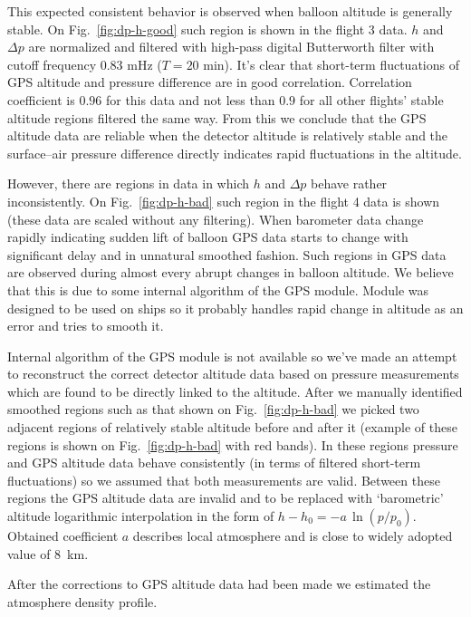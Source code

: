 \documentclass[final,5p,times,twocolumn]{elsarticle}
\begin{document}
This expected consistent behavior is observed when balloon altitude is generally stable. On Fig.~\ref{fig:dp-h-good} such region is shown in the flight 3 data. $h$ and $\Delta p$ are normalized and filtered with high-pass digital Butterworth filter with cutoff frequency $0.83$ mHz ($T=20$ min). It's clear that short-term fluctuations of GPS altitude and pressure difference are in good correlation. Correlation coefficient is $0.96$ for this data and not less than $0.9$ for all other flights' stable altitude regions filtered the same way. From this we conclude that the GPS altitude data are reliable when the detector altitude is relatively stable and the surface--air pressure difference directly indicates rapid fluctuations in the altitude.

However, there are regions in data in which $h$ and $\Delta p$ behave rather inconsistently. On Fig.~\ref{fig:dp-h-bad} such region in the flight 4 data is shown (these data are scaled without any filtering). When barometer data change rapidly indicating sudden lift of balloon GPS data starts to change with significant delay and in unnatural smoothed fashion. Such regions in GPS data are observed during almost every abrupt changes in balloon altitude. We believe that this is due to some internal algorithm of the GPS module. Module was designed to be used on ships so it probably handles rapid change in altitude as an error and tries to smooth it.

Internal algorithm of the GPS module is not available so we've made an attempt to reconstruct the correct detector altitude data based on pressure measurements which are found to be directly linked to the altitude. After we manually identified smoothed regions such as that shown on Fig.~\ref{fig:dp-h-bad} we picked two adjacent regions of relatively stable altitude before and after it (example of these regions is shown on Fig.~\ref{fig:dp-h-bad} with red bands). In these regions pressure and GPS altitude data behave consistently (in terms of filtered short-term fluctuations) so we assumed that both measurements are valid. Between these regions the GPS altitude data are invalid and to be replaced with `barometric' altitude logarithmic interpolation in the form of $h-h_0 = - a \, \ln(p/p_0)$. Obtained coefficient $a$ describes local atmosphere and is close to widely adopted value of $8$~km.

After the corrections to GPS altitude data had been made we estimated the atmosphere density profile. 
\end{document}
